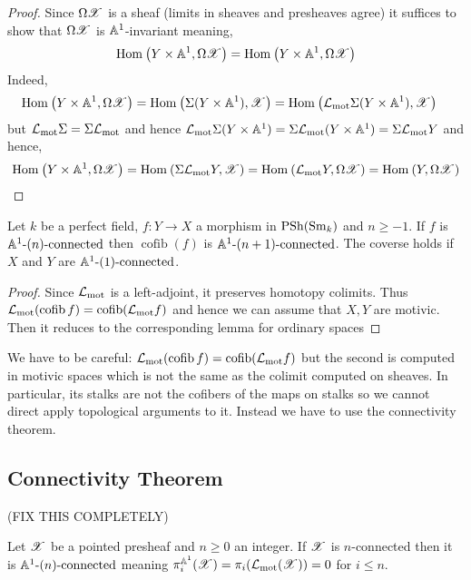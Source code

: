 \documentclass[12pt]{article}
\DeclareMathOperator{\cofib}{\mathrm{cofib}}
\begin{document}
\begin{proof}
Since $\Omega \mathscr{X}$ is a sheaf (limits in sheaves and presheaves agree) it suffices to show that $\Omega \mathscr{X}$ is $\mathbb{A}^1$-invariant meaning,
\[ \mathrm{Hom}_{} \left( Y \times \mathbb{A}^1, \Omega \mathscr{X} \right) = \mathrm{Hom}_{} \left( Y \times \mathbb{A}^1, \Omega \mathscr{X} \right) \]
Indeed,
\begin{align*}
\mathrm{Hom}_{} \left( Y \times \mathbb{A}^1, \Omega \mathscr{X} \right) &= \mathrm{Hom}_{} \left( \Sigma(Y \times \mathbb{A}^1), \mathscr{X} \right) = \mathrm{Hom}_{} \left( \mathcal{L}_{\text{mot}} \Sigma(Y \times \mathbb{A}^1), \mathscr{X} \right)
\end{align*}
but $\mathcal{L}_{\text{mot}} \Sigma = \Sigma \mathcal{L}_{\text{mot}}$ and hence $\mathcal{L}_{\text{mot}} \Sigma(Y \times \mathbb{A}^1) = \Sigma \mathcal{L}_{\text{mot}} (Y \times \mathbb{A}^1) = \Sigma \mathcal{L}_{\text{mot}} Y$ and hence,
\[ \mathrm{Hom}_{} \left( Y \times \mathbb{A}^1, \Omega \mathscr{X} \right) = \mathrm{Hom}_{} \left( \Sigma \mathcal{L}_{\text{mot}} Y, \mathscr{X} \right) = \mathrm{Hom}_{} \left( \mathcal{L}_{\text{mot}} Y, \Omega \mathscr{X} \right) = \mathrm{Hom}_{} \left( Y, \Omega \mathscr{X} \right) \]
\end{proof}

\begin{lemma}[8.8]
Let $k$ be a perfect field, $f : Y \to X$ a morphism in $\mathrm{PSh}(\mathrm{Sm}_k)$ and $n \ge -1$. If $f$ is $\mathbb{A}^1\text{-}(n)\text{-connected}$ then $\cofib(f)$ is $\mathbb{A}^1\text{-}(n+1)\text{-connected}$. The coverse holds if $X$ and $Y$ are $\mathbb{A}^1\text{-}(1)\text{-connected}$.
\end{lemma}


\begin{proof}
Since $\mathcal{L}_{\text{mot}}$ is a left-adjoint, it preserves homotopy colimits. Thus $\L_{\mot}(\cofib f) = \cofib(\L_{\mot} f)$ and hence we can assume that $X, Y$ are motivic. Then it reduces to the corresponding lemma for ordinary spaces 
\end{proof}

{\color{red} We have to be careful: $\L_{\mot}(\cofib f) = \cofib(\L_{\mot} f)$ but the second is computed in motivic spaces which is not the same as the colimit computed on sheaves. In particular, its stalks are not the cofibers of the maps on stalks so we cannot direct apply topological arguments to it. Instead we have to use the connectivity theorem.}

\subsection{Connectivity Theorem}

(FIX THIS COMPLETELY)

\newcommand{\Y}{\mathcal{Y}}
\newcommand{\V}{\mathbb{V}}

\begin{theorem}[Mor12, 1.18]
Let $\mathscr{X}$ be a pointed presheaf and $n \ge 0$ an integer. If $\mathscr{X}$ is $n$-connected then it is $\mathbb{A}^1\text{-}(n)\text{-connected}$ meaning $\pi_i^{\mathbb{A}^1}(\mathscr{X}) = \pi_i(\mathcal{L}_{\text{mot}}(\mathscr{X})) = 0$ for $i \le n$.
\end{theorem}
\end{document}
